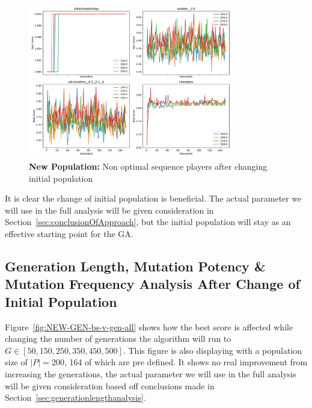 \begin{figure}[h]
    \includegraphics[width=0.8\textwidth, keepaspectratio, center]{./img/plots/NEW_INIT_POP_bs_v_gen_non_performers.pdf}
    \caption{\textbf{New Population:} Non optimal sequence players after changing initial population}\label{fig:NEW-INIT-POP-bs-v-gen-non-performers}
\end{figure}

It is clear the change of initial population is beneficial.
The actual parameter we will use in the full analysis will be given consideration in Section~\ref{sec:conclusionOfApproach}, but the initial population will stay as an effective starting point for the GA.

\subsection{Generation Length, Mutation Potency \& Mutation Frequency Analysis After Change of Initial Population}\label{subsec:starting_pop_analysis}
Figure~\ref{fig:NEW-GEN-bs-v-gen-all} shows how the best score is affected while changing the number of generations the algorithm will run to \(G \in [50,150,250,350,450,500] \).
This figure is also displaying with a population size of \(|P|=200\), 164 of which are pre defined.
It shows no real improvement from increasing the generations, the actual parameter we will use in the full analysis will be given consideration based off conclusions made in Section~\ref{sec:generationlengthanalysis}.

